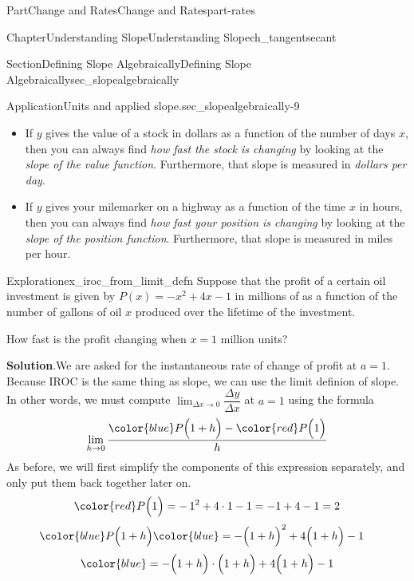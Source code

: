 \documentclass[oneside,10pt,]{tufte-book}
\newcommand{\blocktitlefont}{\relax}
\numberwithin{equation}{chapter}
\newcommand{\amp}{&}
\begin{document}
\begin{partptx}{Part}{Change and Rates}{}{Change and Rates}{}{}{part-rates}
\begin{chapterptx}{Chapter}{Understanding Slope}{}{Understanding Slope}{}{}{ch_tangentsecant}
\begin{sectionptx}{Section}{Defining Slope Algebraically}{}{Defining Slope Algebraically}{}{}{sec_slopealgebraically}
\begin{insight}{Application}{Units and applied slope.}{sec_slopealgebraically-9}
%
\begin{itemize}[label=\textbullet]
\item{}If \(y\) gives the value of a stock in dollars as a function of the number of days \(x\), then you can always find \emph{how fast the stock is changing} by looking at the \emph{slope of the value function}. Furthermore, that slope is measured in \emph{dollars per day}.%
\item{}If \(y\) gives your milemarker on a highway as a function of the time \(x\) in hours, then you can always find \emph{how fast your position is changing} by looking at the \emph{slope of the position function}. Furthermore, that slope is measured in miles per hour.%
\end{itemize}
%
\end{insight}
\begin{exploration}{Exploration}{}{ex_iroc_from_limit_defn}%
Suppose that the profit of a certain oil investment is given by \(P(x) = -x^2 + 4x - 1\) in millions of \textdollar{} as a function of the number of gallons of oil \(x\) produced over the lifetime of the investment.%
\par
How fast is the profit changing when \(x=1\) million units?%
\par\smallskip%
\noindent\textbf{\blocktitlefont Solution}.\hypertarget{ex_iroc_from_limit_defn-2}{}\quad{}We are asked for the instantaneous rate of change of profit at \(a=1\). Because IROC is the same thing as slope, we can use the limit definion of slope.  In other words, we must compute \(\lim_{\Delta x\rightarrow 0}\dfrac{\Delta y}{\Delta x}\) at \(a=1\) using the formula%
\begin{equation*}
\lim_{h\rightarrow 0} \dfrac{ {\color{blue} P\Big(1 + h\Big)}- {\color{red} P\Big(1\Big)} }{h}
\end{equation*}
As before, we will first simplify the components of this expression separately, and only put them back together later on.%
\begin{equation*}
\color{red} P\Big(1\Big) = -\,1^2 + 4\cdot 1 - 1 = -1 + 4 -1 = 2
\end{equation*}
%
\begin{align*}
\color{blue} P\Big(1 + h\Big) \amp\color{blue} = -\Big(1 + h\Big)^2 + 4\Big(1 + h\Big) - 1
\end{align*}
%
\begin{gather*}
\color{blue} = -\Big(1 + h\Big)\cdot \Big(1 + h\Big) + 4\Big(1 + h\Big) - 1
\end{gather*}
%
\begin{gather*}

\end{gather*}
\end{exploration}
\end{sectionptx}
\end{chapterptx}
\end{partptx}
\end{document}
